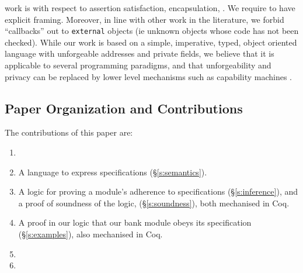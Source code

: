 \vspace{.02in}
 work %
is  with respect to assertion
satisfaction, encapsulation, .
We require  
\funcSpecs to have explicit framing.
{{Moreover, in line} with other work in the literature,} we forbid 
``callbacks'' out to  { \color{blue}\texttt{external}} objects (ie unknown objects
whose code has not been checked).   While our work is based on 
  a simple, imperative, typed, object oriented
language with unforgeable addresses and private fields, we believe
 that %
 it is applicable to several programming paradigms, and 
 that   unforgeability and privacy
 can be replaced 
 by lower level mechanisms such as capability machines \cite{vanproving,davis2019cheriabi}.
 


\subsection{Paper Organization and Contributions}


%
The contributions of this paper are:\begin{enumerate}
\item {}
 \item
A language to
express \Nec specifications (\S\ref{s:semantics}).

 \item
A logic for proving a module's adherence to 
 \Nec specifications (\S\ref{s:inference}), and a proof of soundness of the logic, (\S\ref{s:soundness}),
both mechanised in Coq. 
 \item
A proof in our logic %
  that our bank module obeys its \Nec specification (\S\ref{s:examples}),  also  mechanised in Coq.
\item {}
\item {}

\end{enumerate}


